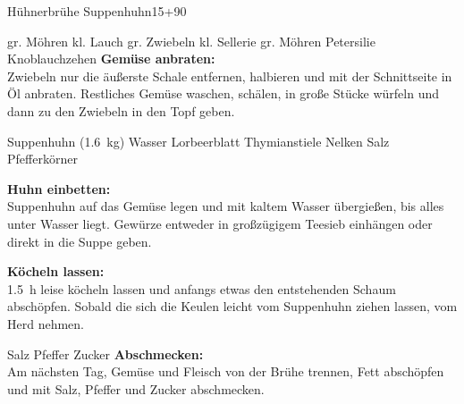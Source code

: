 \begin{MyRecipe}{Hühnerbrühe}{ Suppenhuhn}{\SI{15}{\minuteprime}+\SI{90}{\minuteprime}}

\ingredient[\Calc{2}{\x}]{} {gr. Möhren}
\ingredient[\Calc{1}{\x}]{} {kl. Lauch}
\ingredient[\Calc{2}{\x}]{} {gr. Zwiebeln}
\ingredient[\Calc{1}{\x}]{} {kl. Sellerie}
\ingredient[\Calc{3}{\x}]{} {gr. Möhren}
 {Petersilie}
\ingredient[\Calc{2}{\x}]{} {Knoblauchzehen}
\textbf{Gemüse anbraten:}\\
Zwiebeln nur die äußerste Schale entfernen, halbieren und mit der Schnittseite in Öl anbraten. Restliches Gemüse waschen, schälen, in große Stücke würfeln und dann zu den Zwiebeln in den Topf geben.

\ingredient[\Calc{1}{\x}]{} {Suppenhuhn (\SI{1,6}{\kilogram})}
 {Wasser}
\ingredient[\Calc{2}{\x}]{} {Lorbeerblatt}
\ingredient[\Calc{4}{\x}]{} {Thymianstiele}
\ingredient[\Calc{2}{\x}]{} {Nelken}
 {Salz}
 {Pfefferkörner}

\textbf{Huhn einbetten:}\\
Suppenhuhn auf das Gemüse legen und mit kaltem Wasser übergießen, bis alles unter Wasser liegt. Gewürze entweder in großzügigem Teesieb einhängen oder direkt in die Suppe geben.

\textbf{Köcheln lassen:}\\
\SI{1,5}{\hour} leise köcheln lassen und anfangs etwas den entstehenden Schaum abschöpfen. Sobald die sich die Keulen leicht vom Suppenhuhn ziehen lassen, vom Herd nehmen.\par

\ingredient[]{} {Salz}
\ingredient[]{} {Pfeffer}
\ingredient[]{} {Zucker}
\textbf{Abschmecken:}\\
Am nächsten Tag, Gemüse und Fleisch von der Brühe trennen, Fett abschöpfen und mit Salz, Pfeffer und Zucker abschmecken.









\end{MyRecipe}